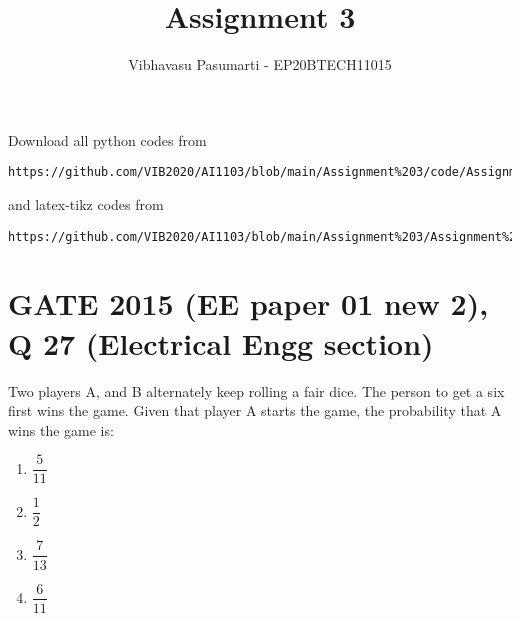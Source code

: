 \documentclass[journal,12pt,twocolumn]{IEEEtran}
\theoremstyle{definition}
\renewcommand{\thefigure}{\theproblem}
\begin{document}
\title{Assignment 3}
\author{Vibhavasu Pasumarti - EP20BTECH11015}
\maketitle
\newpage
\bigskip
\renewcommand{\thefigure}{\theenumi}
\renewcommand{\thetable}{\theenumi}
Download all python codes from 
\begin{lstlisting}
https://github.com/VIB2020/AI1103/blob/main/Assignment%203/code/Assignment%203.py
\end{lstlisting}
and latex-tikz codes from 
\begin{lstlisting}
https://github.com/VIB2020/AI1103/blob/main/Assignment%203/Assignment%203.pdf
\end{lstlisting}
\section{\large GATE 2015 (EE paper 01 new 2), Q 27 (Electrical Engg section)}
Two players A, and B alternately keep rolling a fair dice. The person to get a six first wins the game. Given that player A starts the game, the probability that A wins the game is:\\[5pt]
\begin{enumerate}[label=(\Alph*)]
    \item $\dfrac{5}{11}$\\
    \item $\dfrac{1}{2}$ \\
    \item $\dfrac{7}{13}$\\
    \item $\dfrac{6}{11}$
\end{enumerate}
\end{document}
